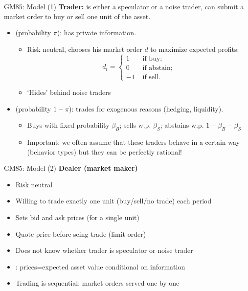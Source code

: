 \documentclass[english,10pt
,aspectratio=169
]{beamer}
\begin{document}
\begin{frame}{GM85: Model (1)}
	\textbf{Trader:} is either a speculator or a noise trader, can submit a market order to buy or sell one unit of the asset.
	\begin{itemize}
		\item {} (probability $\pi$): has private information.
		\begin{itemize}
			\item Risk neutral, chooses his market order $d$ to maximize expected profits:
			\begin{equation*}
				d_t= \left\{
				\begin{aligned}
				1	& \text{ if buy}; \\
				0	& \text{ if abstain}; \\
				-1	& \text{ if sell}.
				\end{aligned}
				\right.
			\end{equation*}
			\item `Hides' behind noise traders
		\end{itemize}
		\item {} (probability $1-\pi$): trades for exogenous reasons (hedging, liquidity).
		\begin{itemize}
			\item Buys with fixed probability $\beta_B$; sells w.p. $\beta_S$; abstains w.p. $1-\beta_B - \beta_S$
			\item \alert{Important}: we often assume that these traders behave in a certain way (behavior types) but they can be perfectly rational!
		\end{itemize}
	\end{itemize}
\end{frame}


\begin{frame}{GM85: Model (2)}
	\textbf{Dealer (market maker)}
	\begin{itemize}
		\item Risk neutral
		\item Willing to trade \alert{exactly one unit} (buy/sell/no trade) each period
		\item Sets \alert{bid and ask prices} (for a single unit)
		\item Quote price before seing trade (limit order)
		\item Does not know whether trader is speculator or noise trader
		\item {}: prices=expected asset value conditional on information
		\item Trading is sequential: market orders served one by one
	\end{itemize}
\end{frame}
\end{document}
